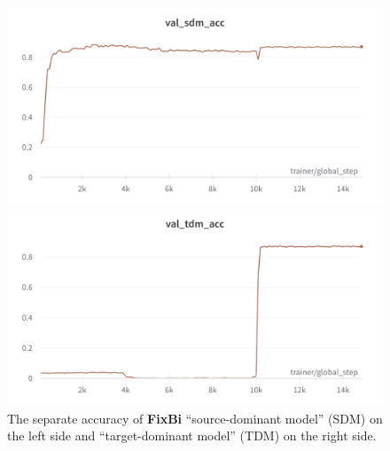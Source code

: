 \begin{figure}[h]
  \centering
  \begin{minipage}[b]{0.49\textwidth}
    \includegraphics[width=\textwidth]{Figures/Results/fixbi_sdm.png}
  \end{minipage}
  \hfill
  \begin{minipage}[b]{0.49\textwidth}
    \includegraphics[width=\textwidth]{Figures/Results/fixbi_tdm.png}
  \end{minipage}
  \caption{The separate accuracy of \textbf{FixBi} “source-dominant model” (SDM) on the left side and “target-dominant model” (TDM) on the right side.}
  \label{fig:sdm_tdm}
\end{figure}

